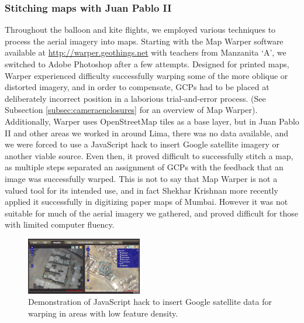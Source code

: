 \documentclass[11pt,oneside,notitlepage]{report}
\begin{document}
{{\subsubsection{Stitching maps with Juan Pablo II}
\label{subsec:stitchingjp2}

Throughout the balloon and kite flights, we employed various techniques to process the aerial imagery into maps. Starting with the Map Warper software available at \url{http://warper.geothings.net} with teachers from Manzanita `A', we switched to Adobe Photoshop after a few attempts. Designed for printed maps, Warper experienced difficulty successfully warping some of the more oblique or distorted imagery, and in order to compensate, GCPs had to be placed at deliberately incorrect position in a laborious trial-and-error process. (See Subsection \ref{subsec:cameraenclosures} for an overview of Map Warper). Additionally, Warper uses OpenStreetMap tiles as a base layer, but in Juan Pablo II and other areas we worked in around Lima, there was no data available, and we were forced to use a JavaScript hack to insert Google satellite imagery or another viable source. Even then, it proved difficult to successfully stitch a map, as multiple steps separated an assignment of GCPs with the feedback that an image was successfully warped. This is not to say that Map Warper is not a valued tool for its intended use, and in fact Shekhar Krishnan more recently applied it successfully in digitizing paper maps of Mumbai. However it was not suitable for much of the aerial imagery we gathered, and proved difficult for those with limited computer fluency.

\begin{figure}
	\begin{flushright}
		\includegraphics[width=0.45\textwidth]{images/map-warper-hack.png}
		\caption{Demonstration of JavaScript hack to insert Google satellite data for warping in areas with low feature density. \cite{waters2009warper}}
	\end{flushright}
\end{figure}

}}
\end{document}
